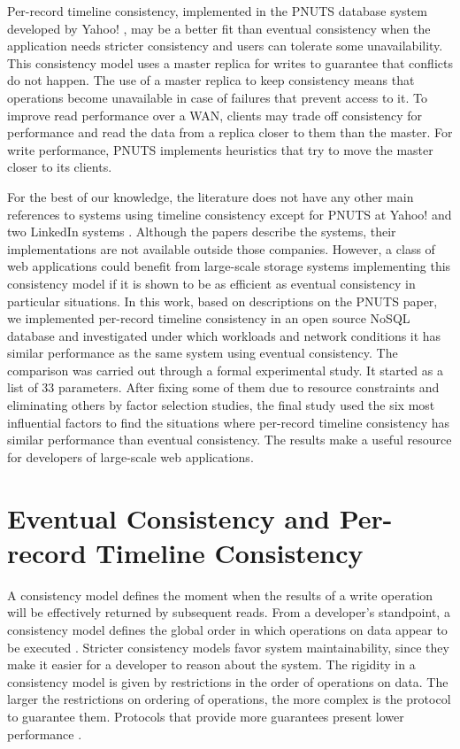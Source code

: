\documentclass[man,floatsintext,12pt]{apa6}
\begin{document}
Per-record timeline consistency, implemented in the PNUTS database system
developed by Yahoo! \parencite{Cooper2008}, may be a better fit than eventual
consistency when the application needs stricter consistency and users can
tolerate some unavailability. This consistency model uses a master replica for
writes to guarantee that conflicts do not happen. The use of a master replica
to keep consistency means that operations become unavailable in case of
failures that prevent access to it. To improve read performance over a WAN,
clients may trade off consistency for performance and read the data from a
replica closer to them than the master. For write performance, PNUTS implements
heuristics that try to move the master closer to its clients.

For the best of our knowledge, the literature does not have any other main
references to systems using timeline consistency except for PNUTS at Yahoo!
\parencite{Cooper2008,Kadambi2011,Ramakrishnan2012,Silberstein2012} and two
LinkedIn systems \parencite{Rao2011,Qiao2013}. Although the papers describe the
systems, their implementations are not available outside those companies.
However, a class of web applications could benefit from large-scale storage
systems implementing this consistency model if it is shown to be as efficient
as eventual consistency in particular situations. In this work, based on
descriptions on the PNUTS paper, we implemented per-record timeline consistency
in an open source NoSQL database and investigated under which workloads and
network conditions it has similar performance as the same system using eventual
consistency. The comparison was carried out through a formal experimental
study. It started as a list of 33 parameters. After fixing some of them due to
resource constraints and eliminating others by factor selection studies, the
final study used the six most influential factors to find the situations where
per-record timeline consistency has similar performance than eventual
consistency. The results make a useful resource for developers of large-scale
web applications.

\section{Eventual Consistency and Per-record Timeline Consistency}

A consistency model defines the moment when the results of a write operation
will be effectively returned by subsequent reads. From a developer's
standpoint, a consistency model defines the global order in which operations on
data appear to be executed \parencite{Adve1995}. Stricter consistency models
favor system maintainability, since they make it easier for a developer to
reason about the system. The rigidity in a consistency model is given by
restrictions in the order of operations on data. The larger the restrictions on
ordering of operations, the more complex is the protocol to guarantee them.
Protocols that provide more guarantees present lower performance
\parencite{Mosberger1993}.
\end{document}
